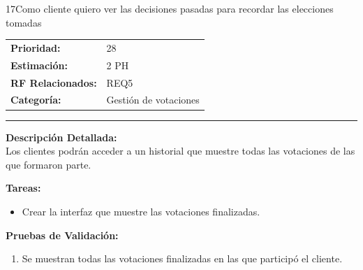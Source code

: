 \begin{hu_card}{17}{Como cliente quiero ver las decisiones pasadas para recordar las elecciones tomadas}
    \begin{tabularx}{\linewidth}{l X}
        \textbf{Prioridad:}   & 28\\
        \textbf{Estimación:}  & 2 PH \\
        \textbf{RF Relacionados:} & REQ5 \\
        \textbf{Categoría:} & Gestión de votaciones \\
    \end{tabularx}

    \vspace{2mm}
    \hrule
    \vspace{2mm}

    \textbf{Descripción Detallada:} \\
    Los clientes podrán acceder a un historial que muestre todas las votaciones de las que formaron parte.

    \vspace{2mm}
    \textbf{Tareas:}
    \begin{itemize}[noitemsep, topsep=0pt]
        \item Crear la interfaz que muestre las votaciones finalizadas.
    \end{itemize}

    \vspace{2mm}
    \textbf{Pruebas de Validación:}
    \begin{enumerate}[noitemsep, topsep=0pt]
        \item Se muestran todas las votaciones finalizadas en las que participó el cliente.
    \end{enumerate}
\end{hu_card}


